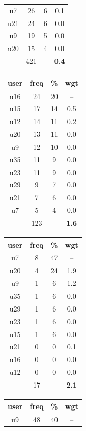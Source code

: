 \begin{table}
\begin{tabular}{ |c|c|c|c| }
	u7 & 26 & 6 & 0.1 \\
	u21 & 24 & 6 & 0.0 \\
	u9 & 19 & 5 & 0.0 \\
	u20 & 15 & 4 & 0.0 \\
	 & 421 & & \textbf{0.4} \\
	\hline
\end{tabular}
\begin{tabular}{ |c|c|c|c| }
	\hline
	\textbf{user} & \textbf{freq} & \textbf{\%} & \textbf{wgt} \\
	\hline
	u16 & 24 & 20 & -- \\
	u15 & 17 & 14 & 0.5 \\
	u12 & 14 & 11 & 0.2 \\
	u20 & 13 & 11 & 0.0 \\
	u9 & 12 & 10 & 0.0 \\
	u35 & 11 & 9 & 0.0 \\
	u23 & 11 & 9 & 0.0 \\
	u29 & 9 & 7 & 0.0 \\
	u21 & 7 & 6 & 0.0 \\
	u7 & 5 & 4 & 0.0 \\
	 & 123 & & \textbf{1.6} \\
	\hline
\end{tabular}
\begin{tabular}{ |c|c|c|c| }
	\hline
	\textbf{user} & \textbf{freq} & \textbf{\%} & \textbf{wgt} \\
	\hline
	u7 & 8 & 47 & -- \\
	u20 & 4 & 24 & 1.9 \\
	u9 & 1 & 6 & 1.2 \\
	u35 & 1 & 6 & 0.0 \\
	u29 & 1 & 6 & 0.0 \\
	u23 & 1 & 6 & 0.0 \\
	u15 & 1 & 6 & 0.0 \\
	u21 & 0 & 0 & 0.1 \\
	u16 & 0 & 0 & 0.0 \\
	u12 & 0 & 0 & 0.0 \\
	 & 17 & & \textbf{2.1} \\
	\hline
\end{tabular}
\begin{tabular}{ |c|c|c|c| }
	\hline
	\textbf{user} & \textbf{freq} & \textbf{\%} & \textbf{wgt} \\
	\hline
	u9 & 48 & 40 & -- \\

\end{tabular}
\end{table}
